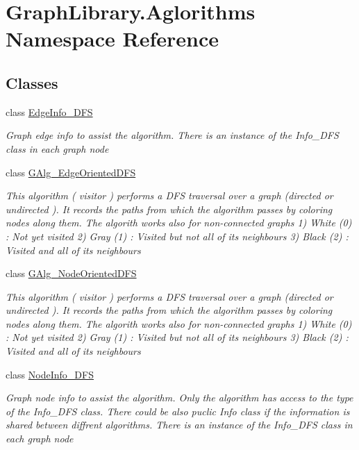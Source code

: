 \hypertarget{namespace_graph_library_1_1_aglorithms}{}\section{Graph\+Library.\+Aglorithms Namespace Reference}
\label{namespace_graph_library_1_1_aglorithms}
\subsection*{Classes}
\begin{DoxyCompactItemize}
\item 
class \hyperlink{class_graph_library_1_1_aglorithms_1_1_edge_info___d_f_s}{Edge\+Info\+\_\+\+D\+F\+S}
\begin{DoxyCompactList}\small\item\em Graph edge info to assist the algorithm. There is an instance of the Info\+\_\+\+D\+F\+S class in each graph node \end{DoxyCompactList}\item 
class \hyperlink{class_graph_library_1_1_aglorithms_1_1_g_alg___edge_oriented_d_f_s}{G\+Alg\+\_\+\+Edge\+Oriented\+D\+F\+S}
\begin{DoxyCompactList}\small\item\em This algorithm ( visitor ) performs a D\+F\+S traversal over a graph (directed or undirected ). It records the paths from which the algorithm passes by coloring nodes along them. The algorith works also for non-\/connected graphs 1) White (0) \+: Not yet visited 2) Gray (1) \+: Visited but not all of its neighbours 3) Black (2) \+: Visited and all of its neighbours \end{DoxyCompactList}\item 
class \hyperlink{class_graph_library_1_1_aglorithms_1_1_g_alg___node_oriented_d_f_s}{G\+Alg\+\_\+\+Node\+Oriented\+D\+F\+S}
\begin{DoxyCompactList}\small\item\em This algorithm ( visitor ) performs a D\+F\+S traversal over a graph (directed or undirected ). It records the paths from which the algorithm passes by coloring nodes along them. The algorith works also for non-\/connected graphs 1) White (0) \+: Not yet visited 2) Gray (1) \+: Visited but not all of its neighbours 3) Black (2) \+: Visited and all of its neighbours \end{DoxyCompactList}\item 
class \hyperlink{class_graph_library_1_1_aglorithms_1_1_node_info___d_f_s}{Node\+Info\+\_\+\+D\+F\+S}
\begin{DoxyCompactList}\small\item\em Graph node info to assist the algorithm. Only the algorithm has access to the type of the Info\+\_\+\+D\+F\+S class. There could be also puclic Info class if the information is shared between diffrent algorithms. There is an instance of the Info\+\_\+\+D\+F\+S class in each graph node \end{DoxyCompactList}\end{DoxyCompactItemize}
